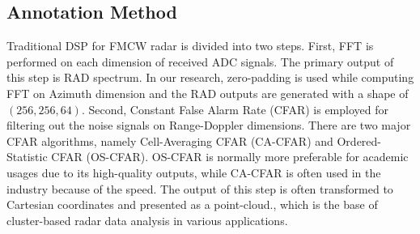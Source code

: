 \documentclass[10pt, conference, compsocconf]{IEEEtran}
\begin{document}

\subsection{Annotation Method}



Traditional DSP for FMCW radar is divided into two steps. First, FFT is performed on each dimension of received ADC signals. The primary output of this step is RAD spectrum. 
In our research, zero-padding is used while computing FFT on Azimuth dimension and the RAD outputs are generated with a shape of $(256, 256, 64)$. 
Second, Constant False Alarm Rate (CFAR) is employed for filtering out the noise signals on Range-Doppler dimensions. There are two major CFAR algorithms, namely Cell-Averaging CFAR (CA-CFAR) and Ordered-Statistic CFAR (OS-CFAR). OS-CFAR is normally more preferable for academic usages due to its high-quality outputs, while CA-CFAR is often used in the industry because of the speed. 
The output of this step is often transformed to Cartesian coordinates and presented as a point-cloud., which is the base of  cluster-based radar data analysis in various applications.
\end{document}
